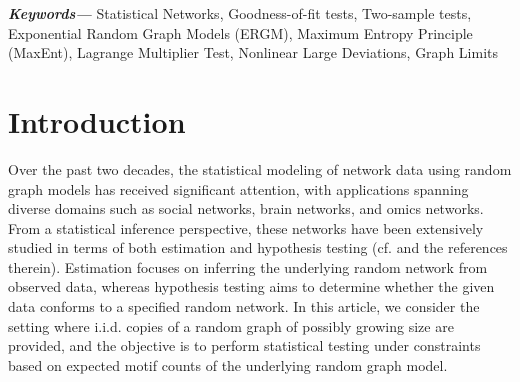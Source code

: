 \documentclass[12pt]{article}
\providecommand{\keywords}[1]
{
  \small	
  \textbf{\textit{Keywords---}} #1
}
\numberwithin{equation}{section}
\begin{document}
\begin{abstract}
Our techniques strongly interface with the burgeoning theory of {\it non-linear large deviations} in the space of random graphs, an approach which we believe would be of much wider applicability in statistical network problems. In a different direction, our inferential approach based on Lagrange multipliers turns out to connect to classical {\it score tests} for constrained MLE in real-valued data that are widely popular in econometrics. Our results provide a unified entropy-based inferential framework for network model assessment across a wide range of network growth regimes. More broadly, it points to a general overarching strategy whereby goodness-of-fit testing can be framed as a constrained optimization problem and the associated Lagrange multiplier can be used for devising the test.
\end{abstract}

\keywords{Statistical Networks, Goodness-of-fit tests, Two-sample tests, Exponential Random Graph Models (ERGM), Maximum Entropy Principle (MaxEnt), Lagrange Multiplier Test, Nonlinear Large Deviations, Graph Limits}





\begingroup
\hypersetup{linkcolor=RawSienna}
\tableofcontents
\endgroup

\newpage


\section{Introduction \label{sec:intro}}


Over the past two decades, the statistical modeling of network data using random graph models has received significant attention, with applications spanning diverse domains such as social networks, brain networks, and omics networks. From a statistical inference perspective, these networks have been extensively studied in terms of both estimation and hypothesis testing (cf. 
 \cite{kolaczyk2009statistical} and the references therein). Estimation focuses on inferring the underlying random network from observed data, whereas hypothesis testing aims to determine whether the given data conforms to a specified random network. In this article, we consider the setting where i.i.d. copies of a random graph of possibly growing size are provided, and the objective is to perform statistical testing under constraints based on expected motif counts of the underlying random graph model.
\end{document}

